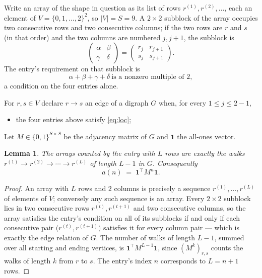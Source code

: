 \documentclass[11pt,a4paper]{article}
\theoremstyle{plain}
\newtheorem{lemma}[theorem]{Lemma}
\theoremstyle{definition}
\begin{document}
Write an array of the shape in question as its list of rows
$r^{(1)},r^{(2)},\dots$, each an element of
$V=\{0,1,\dots,2\}^{2}$, so $|V|=S=9$. A $2\times2$ subblock of the array
occupies two consecutive rows and two consecutive columns; if the two rows are $r$
and $s$ (in that order) and the two columns are numbered $j,j+1$,
the subblock is
\[
\begin{pmatrix}\alpha&\beta\\\gamma&\delta\end{pmatrix}=\begin{pmatrix}r_j&r_{j+1}\\s_j&s_{j+1}\end{pmatrix}.
\]
The entry's requirement on that subblock is
\begin{equation}\label{eq:loc}
\alpha+\beta+\gamma+\delta\ \text{is a nonzero multiple of }2,
\end{equation}
a condition on the four entries alone.

For $r,s\in V$ declare $r\to s$ an edge of a digraph $G$ when, for every
$1\le j\le 2-1$,
\begin{itemize}
\item the four entries above satisfy \eqref{eq:loc};

\end{itemize}
Let $M\in\{0,1\}^{S\times S}$ be the adjacency matrix of $G$ and $\mathbf{1}$ the
all-ones vector.

\begin{lemma}\label{lem:walk}
The arrays counted by the entry with $L$ rows are exactly the walks
$r^{(1)}\to r^{(2)}\to\cdots\to r^{(L)}$ of length $L-1$ in $G$. Consequently
\[
a(n)\;=\;\mathbf{1}^{\!\top}M^{n}\mathbf{1} .
\]
\end{lemma}

\begin{proof}
An array with $L$ rows and $2$ columns is precisely a sequence
$r^{(1)},\dots,r^{(L)}$ of elements of $V$; conversely any such sequence is an array.
Every $2\times2$ subblock lies in two consecutive rows $r^{(t)},r^{(t+1)}$ and two
consecutive columns, so the array satisfies the entry's condition on all of its subblocks
if and only if each consecutive pair $\bigl(r^{(t)},r^{(t+1)}\bigr)$ satisfies it for
every column pair --- which is exactly the edge relation of $G$. The number of walks of
length $L-1$, summed over all starting and ending vertices, is
$\mathbf{1}^{\!\top}M^{L-1}\mathbf{1}$, since $(M^{k})_{r,s}$ counts the walks of
length $k$ from $r$ to $s$. The entry's index $n$ corresponds to $L=n+1$ rows.
\end{proof}
\end{document}
